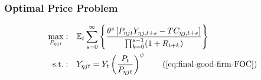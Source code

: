 \documentclass[
	12pt,
	]{article}
\numberwithin{equation}{section}
\DeclareMathOperator{\st}{s.t.}
\newcommand{\E}[1][t]{{\mathbb{E}_{#1}}}
\theoremstyle{definition}
\theoremstyle{plain}
\theoremstyle{plain}
\theoremstyle{plain}
\begin{document}

\subsubsection*{Optimal Price Problem}



\begin{align}
	\max_{P_{\eta jt}}: & \quad \E \sum_{s=0}^{\infty} \left\{ \frac{ \theta^s \left[ P_{\eta jt} Y_{\eta j,t+s} - TC_{\eta j,t+s} \right] }{\prod_{k=0}^{s-1}(1+R_{t+k})} \right\} \label{eq:int-good-firm-optimal-price-problem} \\
	\st: & \quad Y_{\eta jt} = Y_t \left( \frac{P_t}{P_{\eta jt}} \right)^{\psi} \tag{\ref{eq:final-good-firm-FOC}}
\end{align}

\end{document}
